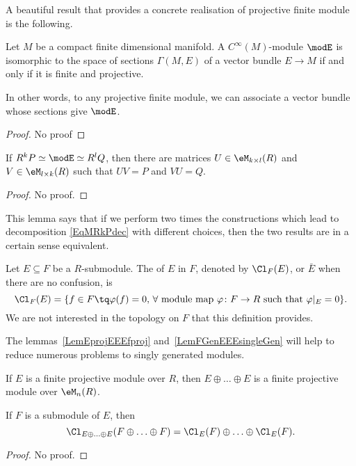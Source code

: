 A beautiful result that provides a concrete realisation of projective finite module is the following.

\begin{theorem}
	Let $M$ be a compact finite dimensional manifold. A $C^{\infty}(M)$-module $\modE$ is isomorphic to the space of sections $\Gamma(M,E)$ of a vector bundle $E\to M$ if and only if it is finite and projective.

	In other words, to any projective finite module, we can associate a vector bundle whose sections give $\modE$.
\end{theorem}

\begin{proof}
	No proof
\end{proof}

\begin{lemma}		\label{LemRklQkR}
	If $R^kP\simeq \modE\simeq R^lQ$, then there are matrices $U\in\eM_{k\times l}(R)$ and $V\in\eM_{l\times k}(R)$ such that $UV=P$ and $VU=Q$.
\end{lemma}
\begin{proof}
	No proof.
\end{proof}
This lemma says that if we perform two times the constructions which lead to decomposition \eqref{EqMRkPdec} with different choices, then the two results are in a certain sense equivalent.

Let $E\subseteq F$ be a $R$-submodule. The  of $E$ in $F$, denoted by $\Cl_F(E)$, or $\bar E$ when there are no confusion, is
\begin{equation}
	\Cl_F(E)=\{ f\in F\tq \varphi(f)=0,\,\forall \text{ module map }\varphi\colon F\to R\text{ such that }\varphi|_E=0 \}.
\end{equation}
We are not interested in the topology on $F$ that this definition provides.

The lemmas~\ref{LemEprojEEEfproj} and~\ref{LemFGenEEEsingleGen} will help to reduce numerous problems to singly generated modules.
\begin{lemma}		\label{LemEprojEEEfproj}
	If $E$ is a finite projective module over $R$, then $E\oplus\ldots\oplus E$ is a finite projective module over $\eM_n(R)$.

	If $F$ is a submodule of $E$, then
	\[
		\Cl_{E\oplus\ldots\oplus E}(F\oplus\ldots\oplus F)=\Cl_E(F)\oplus\ldots\oplus\Cl_E(F).
	\]

\end{lemma}
\begin{proof}
	No proof.
\end{proof}


